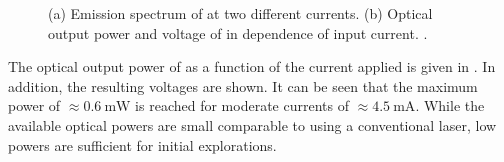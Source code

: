 		\begin{figure}[htp]
			\begin{subfigure}[t]{ 0.49\linewidth}
				\centering
				\caption{}
				\label{subfig::vcsel_output_wavelength}
			\end{subfigure}
			\hfill
			\begin{subfigure}[t]{ 0.49\linewidth}
				\centering
				\caption{}
				\label{subfig::vcsel_output_power}
			\end{subfigure}
			\caption[Emission spectra and optical power of \BmFour]{(a) Emission spectrum of \BmFour at two different currents. (b) Optical output power and voltage of \BmFour in dependence of input current. .}
		\end{figure}

	The optical output power of \BmFour as a function of the current applied is given in . In addition, the resulting voltages are shown. It can be seen that the maximum power of $\approx \SI{0.6}{\mW}$ is reached for moderate currents of $\approx \SI{4.5}{\mA}$. While the available optical powers are small comparable to using a conventional laser, low powers are sufficient for initial explorations.

